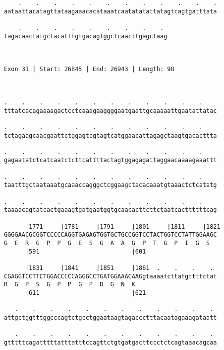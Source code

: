 \documentclass{article}
\begin{document}
\begin{Verbatim}
    .    .    .    .    .    .    .    .    .    .    .    .
aataattacatagttataagaaacacataaatcaatatatattatagtcagtgatttata
                                                            
    .    .    .    .    .    .    .    .    . 
tagacaactatgctacatttgtgacagtggctcaacttgagctaag
                                              
                                              
 
Exon 31 | Start: 26845 | End: 26943 | Length: 98



.    .    .    .    .    .    .    .    .    .    .    .    
tttatcacagaaaagactcctcaaagaaggggaatgaattgcaaaaattgaatattatac
                                                            
.    .    .    .    .    .    .    .    .    .    .    .    
tctagaagcaacgaattctggagtcgtagtcatggaacattagagctaagtgacacttta
                                                            
.    .    .    .    .    .    .    .    .    .    .    .    
gagaatatctcatcaatctcttcattttactagtggagagattaggaacaaaagaaattt
                                                            
.    .    .    .    .    .    .    .    .    .    .    .    
taatttgctaataaatgcaaaccagggctcggaagctacacaaatgtaaactctcatatg
                                                            
.    .    .    .    .    .    .    .    .    .    .    .    
taaaacagtatcactgaaagtgatgaatggtgcaacacttcttctaatcacttttttcag
                                                            
      |1771     |1781     |1791     |1801     |1811     |1821
GGGGAACGCGGTCCCCCAGGTGAGAGTGGTGCTGCCGGTCCTACTGGTCCTATTGGAAGC
G  E  R  G  P  P  G  E  S  G  A  A  G  P  T  G  P  I  G  S  
      |591                          |601                    
  
      |1831     |1841     |1851     |1861  .    .    .    . 
CGAGGTCCTTCTGGACCCCCAGGGCCTGATGGAAACAAGgtaaaatcttatgttttctat
R  G  P  S  G  P  P  G  P  D  G  N  K                       
      |611                          |621                    
  
   .    .    .    .    .    .    .    .    .    .    .    . 
attgctggtttggcccagtctgcctggaataagtagaccctttacaatagaaagataatt
                                                            
   .    .    .    .    .    .    .    .    .    .    .    . 
gtttttcagatttttatttatttccagttctgtgatgacttccctctcagtaaacagcaa
                                                            

\end{Verbatim}
\end{document}
